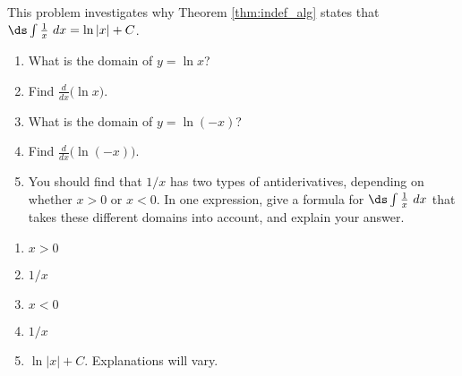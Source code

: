 {This problem investigates why Theorem \ref{thm:indef_alg} states that $\ds \int \frac1x\ dx = \ln |x| + C$.\label{exer:05_01_ex_39}
\begin{enumerate}
	\item		What is the domain of $y = \ln x$?
	\item		Find $\frac{d}{dx}\big(\ln x\big)$. 
	\item		What is the domain of $y = \ln (-x)$?
	\item		Find $\frac{d}{dx}\big(\ln (-x)\big)$. 
	\item		You should find that $1/x$ has two types of antiderivatives, depending on whether $x>0$ or $x<0$. In one expression, give a formula for $\ds \int \frac{1}{x}\ dx$ that takes these different domains into account, and explain your answer.
	\end{enumerate}
}
{\begin{enumerate}
\item		$x>0$
\item		$1/x$
\item		$x<0$
\item		$1/x$
\item		$\ln |x|+C$. Explanations will vary.
\end{enumerate}
}

